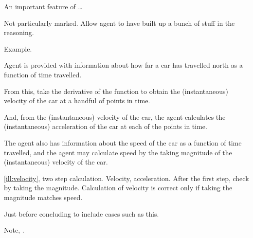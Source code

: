 \begin{note}
  An important feature of \qzS{} \dots

  Not particularly marked.
  Allow agent to have built up a bunch of stuff in the reasoning.

  Example.

  \begin{illustration}[Velocity]
    \label{ill:velocity}
    Agent is provided with information about how far a car has travelled north as a function of time travelled.

    From this, take the derivative of the function to obtain the (instantaneous) velocity of the car at a handful of points in time.

    And, from the (instantaneous) velocity of the car, the agent calculates the (instantaneous) acceleration of the car at each of the points in time.

    The agent also has information about the speed of the car as a function of time travelled, and the agent may calculate speed by the taking magnitude of the (instantaneous) velocity of the car.
  \end{illustration}

  

  \autoref{ill:velocity}, two step calculation.
  Velocity, acceleration.
  After the first step, check by taking the magnitude.
  Calculation of velocity is correct only if taking the magnitude matches speed.

  Just before concluding to include cases such as this.

  Note, \cScen{}.
\end{note}

